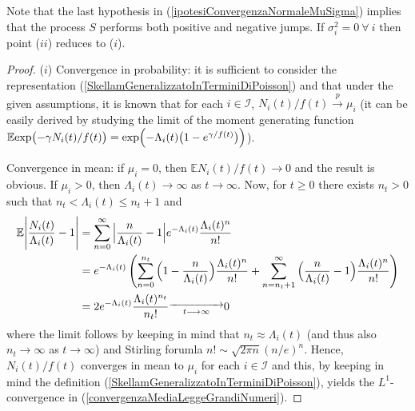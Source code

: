 \documentclass[12pt, twoside, english, headsepline]{article}
\theoremstyle{definition} %
\numberwithin{equation}{section} %
\begin{document}
Note that the last hypothesis in (\ref{ipotesiConvergenzaNormaleMuSigma}) implies that the process $S$ performs both positive and negative jumps. If $\sigma^2_i = 0\ \forall\ i$ then point ($ii$) reduces to ($i$).

\begin{proof}
($i$) Convergence in probability: it is sufficient to consider the representation (\ref{SkellamGeneralizzatoInTerminiDiPoisson}) and that under the given assumptions, it is known that for each $i\in\mathcal{I}$,  $N_i(t)/f(t)\stackrel{p}{\longrightarrow} \mu_i$ (it can be easily derived by studying the limit of the moment generating function $\mathbb{E}\text{exp}\bigl(-\gamma N_i(t)/f(t) \bigr) =\text{exp}\Bigl(- \Lambda_i(t)\bigl(1-e^{\gamma/f(t)}\bigr) \Bigr) $).

Convergence in mean: if $\mu_i = 0$, then $\mathbb{E}N_i(t)/f(t) \longrightarrow 0$ and the result is obvious. If $\mu_i>0$, then $\Lambda_i(t)\longrightarrow\infty$ as $t\rightarrow\infty$. Now, for $t\ge0$ there exists $n_t>0$ such that $n_t <\Lambda_i(t) \le n_t+1$ and 
\begin{align*}
	\mathbb{E}\Bigg|\frac{N_i(t)}{\Lambda_i(t)}- 1\Bigg| &= \sum_{n=0}^\infty \Big|\frac{n}{\Lambda_i(t)}- 1\Big| e^{-\Lambda_i(t)}\frac{\Lambda_i(t)^n}{n!}\\
	& =  e^{-\Lambda_i(t)}\left(\sum_{n=0}^{n_t} \Big(1-\frac{n}{\Lambda_i(t)}\Big)\frac{\Lambda_i(t)^n}{n!} + \sum_{n=n_t+1}^\infty \Big(\frac{n}{\Lambda_i(t)}-1\Big)\frac{\Lambda_i(t)^n}{n!}\right)\\
	& = 2 e^{-\Lambda_i(t)}\frac{\Lambda_i(t)^{n_t}}{n_t!} \substack{\xrightarrow{\hspace*{1.5cm}}\\t\longrightarrow \infty } 0
\end{align*}
where the limit follows by keeping in mind that $n_t\approx \Lambda_i(t)$ (and thus also $n_t\longrightarrow\infty $ as $t\rightarrow\infty$) and Stirling forumla $n! \sim \sqrt{2\pi n}(n/e)^n$. Hence, $N_i(t)/f(t)$ converges in mean to $\mu_i$ for each $i\in\mathcal{I}$ and this, by keeping in mind the definition (\ref{SkellamGeneralizzatoInTerminiDiPoisson}), yields the $L^1$-convergence in (\ref{convergenzaMediaLeggeGrandiNumeri}).

\end{proof}
\end{document}
